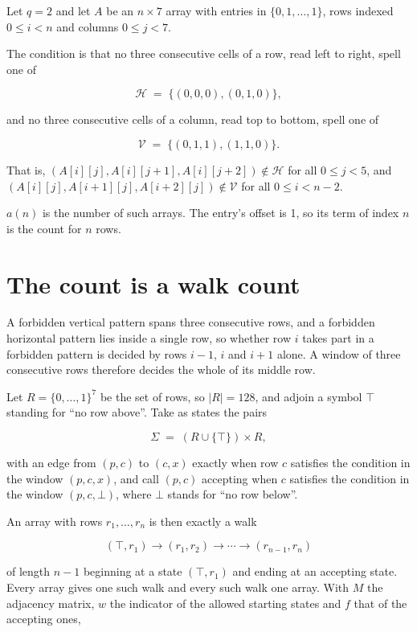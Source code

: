 \documentclass[11pt]{article}
\theoremstyle{definition}
\begin{document}
Let $q = 2$ and let $A$ be an $n \times 7$ array with entries in $\{0,1,\dots,1\}$, rows indexed $0 \le i < n$ and columns $0 \le j < 7$.

The condition is that no three consecutive cells of a row, read left to right, spell one of

\[\mathcal{H} \;=\; \{(0,0,0), (0,1,0)\},\]

and no three consecutive cells of a column, read top to bottom, spell one of

\[\mathcal{V} \;=\; \{(0,1,1), (1,1,0)\}.\]

That is, $(A[i][j],A[i][j{+}1],A[i][j{+}2]) \notin \mathcal{H}$ for all $0 \le j < 5$, and $(A[i][j],A[i{+}1][j],A[i{+}2][j]) \notin \mathcal{V}$ for all $0 \le i < n-2$.

$a(n)$ is the number of such arrays. The entry's offset is 1, so its term of index $n$ is the count for $n$ rows.

\section{The count is a walk count}

A forbidden vertical pattern spans three consecutive rows, and a forbidden horizontal pattern lies inside a single row, so whether row $i$ takes part in a forbidden pattern is decided by rows $i-1$, $i$ and $i+1$ alone. A window of three consecutive rows therefore decides the whole of its middle row.

Let $R = \{0,\dots,1\}^{7}$ be the set of rows, so $|R| = 128$, and adjoin a symbol $\top$ standing for ``no row above''. Take as states the pairs

\[\Sigma \;=\; (R \cup \{\top\}) \times R,\]

with an edge from $(p,c)$ to $(c,x)$ exactly when row $c$ satisfies the condition in the window $(p,c,x)$, and call $(p,c)$ accepting when $c$ satisfies the condition in the window $(p,c,\bot)$, where $\bot$ stands for ``no row below''.

An array with rows $r_1,\dots,r_n$ is then exactly a walk

\[(\top,r_1) \to (r_1,r_2) \to \cdots \to (r_{n-1},r_n)\]

of length $n-1$ beginning at a state $(\top,r_1)$ and ending at an accepting state. Every array gives one such walk and every such walk one array. With $M$ the adjacency matrix, $w$ the indicator of the allowed starting states and $f$ that of the accepting ones,
\end{document}
